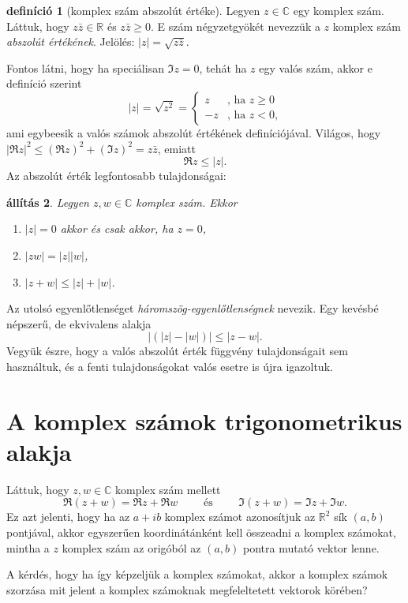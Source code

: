 \documentclass[9pt, a4paper, showtrims]{memoir}
\theoremstyle{plain}
\newtheorem{proposition}{állítás}[chapter]
\theoremstyle{remark}
\theoremstyle{definition}
\newtheorem{definition}[proposition]{definíció}
\begin{document}
\begin{definition}[komplex szám abszolút értéke]
    Legyen $z\in\mathbb{C}$ egy komplex szám.
    Láttuk, hogy 
    $z\bar{z}\in\mathbb{R}$ és  
    $z\bar{z}\geq 0$.
    E szám négyzetgyökét nevezzük a $z$ komplex szám \emph{abszolút értékének}.
    Jelölés: $|z|=\sqrt{z\bar{z}}$.
\end{definition}
Fontos látni, hogy ha speciálisan $\Im z=0$, 
tehát ha $z$ egy valós szám,
akkor e definíció szerint
\[
    |z|=
    \sqrt{z^2}=
    \begin{cases}
        z&\text{, ha }z\geq 0\\
        -z&\text{, ha }z<0\text{,}
    \end{cases}
\]
ami egybeesik a valós számok abszolút értékének definíciójával.
Világos, hogy $|\Re z|^2\leq(\Re z)^2+(\Im z)^2=z\bar{z}$, emiatt
\[
    \Re z\leq |z|.
\]
Az abszolút érték legfontosabb tulajdonságai:
\begin{proposition}
    Legyen $z,w\in\mathbb{C}$ komplex szám.
    Ekkor
    \begin{enumerate}
        \item $|z|=0$ akkor és csak akkor, ha $z=0$,
        \item $|zw|=|z||w|$,
        \item $|z+w|\leq |z|+|w|$.\qedhere
    \end{enumerate}
\end{proposition}
Az utolsó egyenlőtlenséget \emph{háromszög-egyenlőtlenségnek} nevezik.
Egy kevésbé népszerű, de ekvivalens alakja
\[
    \left|\left( |z|-|w| \right)\right|\leq|z-w|.
\]
Vegyük észre, hogy a valós abszolút érték függvény tulajdonságait sem használtuk,
és a fenti tulajdonságokat valós esetre is újra igazoltuk.
\section{A komplex számok trigonometrikus alakja}
Láttuk, hogy $z,w\in\mathbb{C}$ komplex szám mellett
\[
    \Re\left( z+w \right)=\Re z+\Re w
    \qquad
    \text{ és }
    \qquad
    \Im\left( z+w \right)=\Im z+\Im w.
\]
Ez azt jelenti, hogy ha az $a+ib$ komplex számot azonosítjuk az $\mathbb{R}^2$ sík
$\left( a,b \right)$ pontjával, 
akkor egyszerűen koordinátánként kell összeadni a komplex számokat, mintha a $z$ komplex szám
az origóból az $\left( a,b \right)$ pontra mutató vektor lenne.

A kérdés, hogy ha így képzeljük a komplex számokat, 
akkor a komplex számok szorzása mit jelent a komplex számoknak megfeleltetett vektorok körében?
\end{document}

